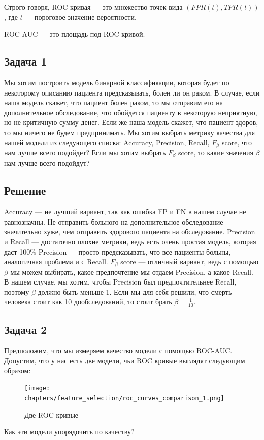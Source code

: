 Строго говоря, ROC кривая --- это множество точек вида $(FPR(t), TPR(t))$, где $t$ --- пороговое значение вероятности.

ROC-AUC --- это площадь под ROC кривой.

\subsection*{Задача 1}

Мы хотим построить модель бинарной классификации, которая будет по некоторому описанию пациента предсказывать, болен ли он раком.
В случае, если наша модель скажет, что пациент болен раком, то мы отправим его на дополнительное обследование, что обойдется пациенту в некоторую неприятную, но не критичную сумму денег.
Если же наша модель скажет, что пациент здоров, то мы ничего не будем предпринимать.
Мы хотим выбрать метрику качества для нашей модели из следующего списка: Accuracy, Precision, Recall, $F_{\beta}$ score, что нам лучше всего подойдет?
Если мы хотим выбрать $F_{\beta}$ score, то какие значения $\beta$ нам лучше всего подойдут?

\subsection*{Решение}
Accuracy --- не лучший вариант, так как ошибка FP и FN в нашем случае не равнозначны.
Не отправить больного на дополнительное обследование значительно хуже, чем отправить здорового пациента на обследование.
Precision и Recall --- достаточно плохие метрики, ведь есть очень простая модель, которая даст 100\% Precision --- просто предсказывать, что все пациенты больны, аналогичная проблема и с Recall.
$F_{\beta}$ score --- отличный вариант, ведь с помощью $\beta$ мы можем выбирать, какое предпочтение мы отдаем Precision, а какое Recall.
В нашем случае, мы хотим, чтобы Precision был предпочтительнее Recall, поэтому $\beta$ должно быть меньше 1.
Если мы для себя решили, что смерть человека стоит как 10 дообследований, то стоит брать $\beta = \frac{1}{10}$.

\subsection*{Задача 2}
Предположим, что мы измеряем качество модели с помощью ROC-AUC. Допустим, что у нас есть две модели, чьи ROC кривые выглядят следующим образом:
\begin{figure}[h]
    \centering
    \texttt{[image: chapters/feature\_selection/roc\_curves\_comparison\_1.png]}
    \caption{Две ROC кривые}
\end{figure}
Как эти модели упорядочить по качеству?

